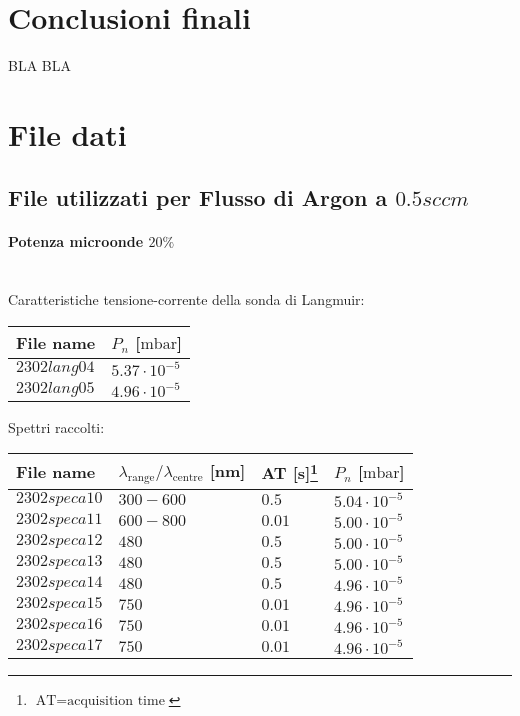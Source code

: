 \section{Conclusioni finali}
BLA BLA

\section{File dati}
\subsection{File utilizzati per Flusso di Argon a $0.5sccm$}

\paragraph*{Potenza microonde $\text{20\%}$} ~\\
Caratteristiche tensione-corrente della sonda di Langmuir:
\begin{center}
\begin{tabular}{p{3cm}p{3cm}}
\toprule
File name	&$P_{n}$ [$\si{\milli\bar}$]\\
\midrule
$2302lang04$	&$5.37\cdot10^{-5}$\\
$2302lang05$	&$4.96\cdot10^{-5}$\\
\bottomrule
\end{tabular}
\end{center}

Spettri raccolti:
\begin{center}
\begin{tabular}{p{3cm}p{4cm}p{2cm}p{3cm}}
\toprule
File name	&$\lambda_\text{range}\text{/}\lambda_\text{centre}$ [nm] &AT [s]\footnote{$\text{AT}=\text{acquisition time}$} &$P_{n}$ [$\si{\milli\bar}$]\\
\midrule
$2302speca10$	&$300-600$	&$0.5$		&$5.04\cdot10^{-5}$\\
$2302speca11$	&$600-800$	&$0.01$		&$5.00\cdot10^{-5}$\\
$2302speca12$	&$480$		&$0.5$		&$5.00\cdot10^{-5}$\\
$2302speca13$	&$480$		&$0.5$		&$5.00\cdot10^{-5}$\\
$2302speca14$	&$480$		&$0.5$		&$4.96\cdot10^{-5}$\\
$2302speca15$	&$750$		&$0.01$		&$4.96\cdot10^{-5}$\\
$2302speca16$	&$750$		&$0.01$		&$4.96\cdot10^{-5}$\\
$2302speca17$	&$750$		&$0.01$		&$4.96\cdot10^{-5}$\\
\bottomrule
\end{tabular}
\end{center}

